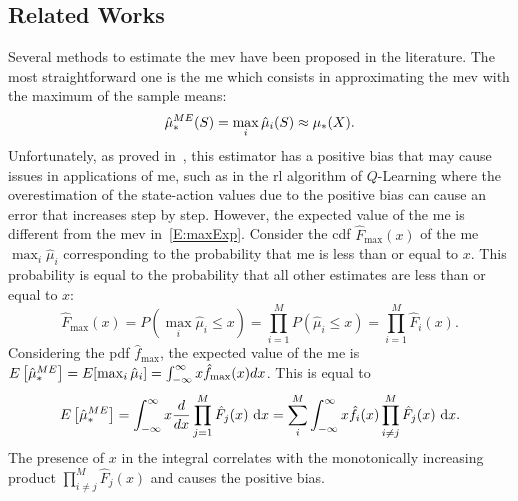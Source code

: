 \subsection{Related Works}
Several methods to estimate the \gls{mev} have been proposed in the literature. The most straightforward one is the \gls{me} which consists in approximating the \gls{mev} with the maximum of the sample means:
\begin{equation}\label{E:biasME}
\hat\mu_*^{ME}(S) = \max_{i}\hat{\mu}_{i}(S) \approx \mu_{*}(X).
\end{equation}
Unfortunately, as proved in~\cite{smith2006optimizer}, this estimator has a positive bias that may cause issues in applications of \gls{me}, such as in the \gls{rl} algorithm of $Q$-Learning where the overestimation of the state-action values due to the positive bias can cause an error that increases step by step. However, the expected value of the \gls{me} is different from the \gls{mev} in~\ref{E:maxExp}. Consider the \gls{cdf} $\hat{F}_{\max}(x)$ of the \gls{me} $\max_{i}\hat\mu_{i}$ corresponding to the probability that \gls{me} is less than or equal to $x$. This probability is equal to the probability that all other estimates are less than or equal to $x$: 
$$\hat F_{\max}(x) = P(\max_{i}\hat\mu_{i} \leq x) = \prod^M_{i=1} P(\hat\mu_{i} \leq x) = \prod^M_{i=1} \hat F_i(x).$$
Considering the \gls{pdf} $\hat f_{\max}$, the expected value of the \gls{me} is $E\left[\hat\mu_*^{ME}\right] = E [ \max_{i}\hat\mu_{i} ] = \int^{\infty}_{-\infty} x \hat f_{\max}(x) dx$. This is equal to
\begin{equation*}
E\left[\hat\mu_*^{ME}\right] = \int^{\infty}_{-\infty} x \frac{d}{dx} \prod^M_{j=1} \hat F_j(x)~\mathrm{d}x =\sum^M_i \int^{\infty}_{-\infty} x \hat f_i(x) \prod^M_{i \neq j} \hat F_j(x)~\mathrm{d}x.
\end{equation*}
The presence of $x$ in the integral correlates with the monotonically increasing product $\prod^M_{i \neq j} \hat F_j(x)$ and causes the positive bias.

